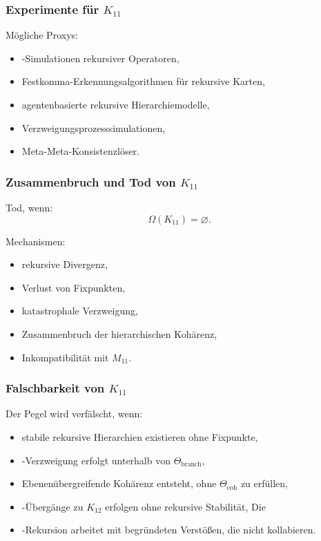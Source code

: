 \subsubsection{Experimente für $K_{11}$}

Mögliche Proxys:
\begin{itemize}
    \item-Simulationen rekursiver Operatoren,
    \item Festkomma-Erkennungsalgorithmen für rekursive Karten,
    \item agentenbasierte rekursive Hierarchiemodelle,
    \item Verzweigungsprozesssimulationen,
    \item Meta-Meta-Konsistenzlöser.
\end{itemize}

\subsubsection{Zusammenbruch und Tod von $K_{11}$}

Tod, wenn:
\[
\Omega(K_{11})=\varnothing.
\]

Mechanismen:
\begin{itemize}
    \item rekursive Divergenz,
    \item Verlust von Fixpunkten,
    \item katastrophale Verzweigung,
    \item Zusammenbruch der hierarchischen Kohärenz,
    \item Inkompatibilität mit $M_{11}$.
\end{itemize}

\subsubsection{Falschbarkeit von $K_{11}$}

Der Pegel wird verfälscht, wenn:
\begin{itemize}
    \item stabile rekursive Hierarchien existieren ohne Fixpunkte,
    \item-Verzweigung erfolgt unterhalb von $\Theta_{\mathrm{branch}}$,
    \item Ebenenübergreifende Kohärenz entsteht, ohne $\Theta_{\mathrm{coh}}$ zu erfüllen,
    \item-Übergänge zu $K_{12}$ erfolgen ohne rekursive Stabilität,
    Die \item-Rekursion arbeitet mit begründeten Verstößen, die nicht kollabieren.
\end{itemize}


